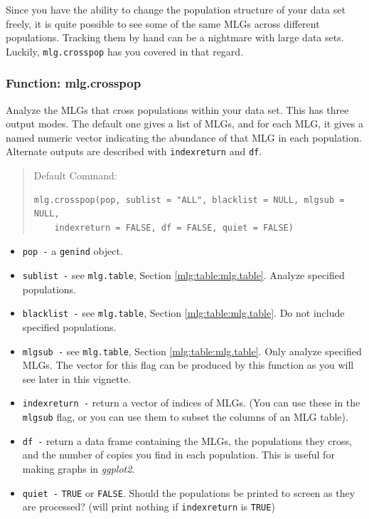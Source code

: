 \documentclass[letterpaper]{article}\usepackage[]{graphicx}\usepackage[]{color}
\makeatletter
\newenvironment{kframe}{%
 \def\at@end@of@kframe{}%
 \ifinner\ifhmode%
  \def\at@end@of@kframe{\end{minipage}}%
  \begin{minipage}{\columnwidth}%
 \fi\fi%
 \def\FrameCommand##1{\hskip\@totalleftmargin \hskip-\fboxsep
 \colorbox{shadecolor}{##1}\hskip-\fboxsep
     \hskip-\linewidth \hskip-\@totalleftmargin \hskip\columnwidth}%
 \MakeFramed {\advance\hsize-\width
   \@totalleftmargin\z@ \linewidth\hsize
   \@setminipage}}%
 {\par\unskip\endMakeFramed%
 \at@end@of@kframe}
\newenvironment{knitrout}{}{} %
\newcommand{\tab}{\hspace*{1em}}
\makeatother
\begin{document}
\tab\tab Since you have the ability to change the population structure of your data set freely, it is quite possible to see some of the same MLGs across different populations. Tracking them by hand can be a nightmare with large data sets. Luckily, \texttt{mlg.crosspop} has you covered in that regard.
\subsubsection{Function: mlg.crosspop}\label{mlg:cross:mlg.crosspop}

\tab\tab Analyze the MLGs that cross populations within your data set. This has three output modes. The default one gives a list of MLGs, and for each MLG, it gives a named numeric vector indicating the abundance of that MLG in each population. Alternate outputs are described with \texttt{indexreturn} and \texttt{df}.
\begin{quote}
Default Command:
\begin{knitrout}
\color{fgcolor}\begin{kframe}
\begin{verbatim}
mlg.crosspop(pop, sublist = "ALL", blacklist = NULL, mlgsub = NULL, 
    indexreturn = FALSE, df = FALSE, quiet = FALSE)
\end{verbatim}
\end{kframe}
\end{knitrout}

\end{quote}
  \begin{itemize}
    \item \texttt{pop -} a \texttt{genind} object.
    \item \texttt{sublist -} see \texttt{mlg.table}, Section \ref{mlg:table:mlg.table}. Analyze specified populations.
    \item \texttt{blacklist -} see \texttt{mlg.table}, Section \ref{mlg:table:mlg.table}. Do not include specified populations.
    \item \texttt{mlgsub -} see \texttt{mlg.table}, Section \ref{mlg:table:mlg.table}. Only analyze specified MLGs. The vector for this flag can be produced by this function as you will see later in this vignette.
    \item \texttt{indexreturn -} return a vector of indices of MLGs. (You can use these in the \texttt{mlgsub} flag, or you can use them to subset the columns of an MLG table). 
    \item \texttt{df -} return a data frame containing the MLGs, the populations they cross, and the number of copies you find in each population. This is useful for making graphs in \textit{ggplot2}.
    \item \texttt{quiet -} \texttt{TRUE} or \texttt{FALSE}. Should the populations be printed to screen as they are processed? (will print nothing if \texttt{indexreturn} is \texttt{TRUE})
  \end{itemize}
  
\end{document}
